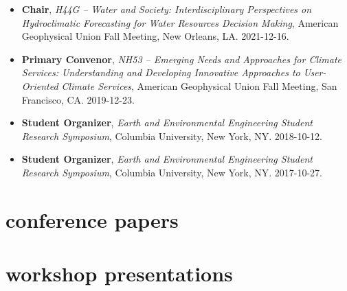 \documentclass[10pt,oneside]{article}
\begin{document}
\mbox{}\vspace{-\dimexpr\baselineskip\relax}

\begin{itemize}[label={}]
  
  \item \textbf{Chair}, \textit{H44G -- Water and Society: Interdisciplinary Perspectives on Hydroclimatic Forecasting for Water Resources Decision Making}, American Geophysical Union Fall Meeting, New Orleans, LA. 2021-12-16.
        
  \item \textbf{Primary Convenor}, \textit{NH53 -- Emerging Needs and Approaches for Climate Services: Understanding and Developing Innovative Approaches to User-Oriented Climate Services}, American Geophysical Union Fall Meeting, San Francisco, CA. 2019-12-23.
        
  \item \textbf{Student Organizer}, \textit{Earth and Environmental Engineering Student Research Symposium}, Columbia University, New York, NY. 2018-10-12.
        
  \item \textbf{Student Organizer}, \textit{Earth and Environmental Engineering Student Research Symposium}, Columbia University, New York, NY. 2017-10-27.
        
\end{itemize}

\section{conference papers}

\mbox{}\vspace{-\dimexpr\baselineskip\relax}
\vspace*{-1em}
\printbibliography[type=inproceedings, heading=none]


\section{workshop presentations}

\mbox{}\vspace{-\dimexpr\baselineskip\relax}
\end{document}
